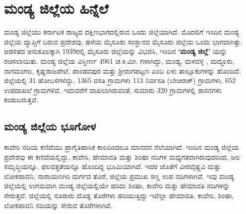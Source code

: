 
\chapter{ಮಂಡ್ಯ ಜಿಲ್ಲೆಯ ಹಿನ್ನೆಲೆ}

 ಮಂಡ್ಯ ಜಿಲ್ಲೆಯು ಕರ್ನಾಟಕ ರಾಜ್ಯದ ದಕ್ಷಿಣಭಾಗದಲ್ಲಿರುವ ಒಂದು ಜಿಲ್ಲೆಯಾಗಿದೆ. ಮೊದಲಿಗೆ ಇಂದಿನ ಮಂಡ್ಯ ಜಿಲ್ಲೆಯ ವ್ಯಾಪ್ತಿಗೆ ಬರುವ ಪ್ರದೇಶವು, ಹಳೆಯ ಮೈಸೂರು ಸಂಸ್ಥಾನದ ಮೈಸೂರು ಜಿಲ್ಲೆಯ ಒಂದು ಭಾಗವಾಗಿತ್ತು. ಆಡಳಿತದ ಅನುಕೂಲಕ್ಕಾಗಿ 1939ರಲ್ಲಿ ಮೈಸೂರು ಜಿಲ್ಲೆಯನ್ನು ವಿಭಜಿಸಿ, ಇಂದಿನ \textbf{‘ಮಂಡ್ಯ ಜಿಲ್ಲೆ’ }ಯನ್ನು ರಚಿಸಲಾಯಿತು. ಮಂಡ್ಯ ಜಿಲ್ಲೆಯ ವಿಸ್ತೀರ್ಣ 4961 ಚ.ಕಿ.ಮೀ. ಗಳಾಗಿದ್ದು, ಮಂಡ್ಯ, ಮಳವಳ್ಳಿ , ಮದ್ದೂರು, ನಾಗಮಂಗಲ, ಕೃಷ್ಣರಾಜಪೇಟೆ, ಪಾಂಡವಪುರ ಮತ್ತು ಶ‍್ರೀರಂಗಪಟ್ಟಣ ಎಂಬ ಏಳು ತಾಲ್ಲೂಕುಗಳನ್ನು ಹೊಂದಿದೆ. ಜಿಲ್ಲೆಯಲ್ಲಿ 31 ಹೋಬಳಿಗಳಿದ್ದು, 1365 ವಸತಿ ಗ್ರಾಮಗಳು 113 ನಿರ್ವಸತಿ (ಬೇಚಿರಾಕ್) ಗ್ರಾಮಗಳು, 652 ಉಪದಾಖಲೆ ಗ್ರಾಮಗಳಿವೆ. ಇದುವರೆಗೆ ದಾಖಲಾಗಿರುವಂತೆ, ಸುಮಾರು 320 ಗ್ರಾಮಗಳಲ್ಲಿ ಶಾಸನಗಳು ಕಂಡುಬರುತ್ತವೆ.

\section*{ಮಂಡ್ಯ ಜಿಲ್ಲೆಯ ಭೂಗೋಳ}

ಕಾವೇರಿ ನದಿಯ ಕಣಿವೆಯು ಪ್ರಾಗೈತಿಹಾಸಿಕ ಕಾಲದಿಂದಲೂ ಮಾನವನ ನೆಲೆಯಾಗಿದೆ. ಇಂದಿನ ಮಂಡ್ಯ ಜಿಲ್ಲೆಯ ಪ್ರದೇಶವು ಈ ಕಣಿವೆಯಲ್ಲಿದ್ದು, ಕಾವೇರಿ, ಹೇಮಾವತಿ ಮತ್ತು ಶಿಂಷಾ ನದಿಗಳ ಮಧ್ಯಗತವಾಗಿರುವುದರಿಂದ, ಜಲ ಸಮೃದ್ಧಿಯನ್ನೂ, ಫಲವತ್ತತೆಯನ್ನೂ ಹೊಂದಿದ್ದ ಭೂಮಿಯಾಗಿದೆ. ಇದರ ಜೊತೆಗೆ ವೀರವೈಷ್ಣವಿ\index{} ಮತ್ತು ಲೋಕಪಾವನಿ, ನಾರಾಯಣಗಿರಿ ದುರ್ಗದ ತೊರೆ, ಜಿಲ್ಲೆಯ ಪ್ರಮುಖ ಸಣ್ಣ ಉಪ ನದಿಗಳಾಗಿವೆ. ಇವು ಮಂಡ್ಯ ಜಿಲ್ಲೆಯಲ್ಲಿ ಉಗಮವಾಗಿ ಮಂಡ್ಯ ಜಿಲ್ಲೆಯಲ್ಲಿಯೇ ಹರಿದು ಶಿಂಷಾ, ಕಾವೇರಿ ಮತ್ತು ಹೇಮಾವತಿ ನದಿಗಳನ್ನು ಸೇರುತ್ತವೆ. ಜಿಲ್ಲೆಯಲ್ಲಿ ನೂರಾರು ದೊಡ್ಡ ತೊರೆಗಳು ಹರಿಯುತ್ತಿದ್ದು ಇವೆಲ್ಲಾ ಹೇಮಾವತಿ, ಕಾವೇರಿ, ಶಿಂಷಾ, ಲೋಕಪಾವನಿ ನದಿಯನ್ನು ಸೇರುವ ತೊರೆಗಳಾಗಿವೆ.

